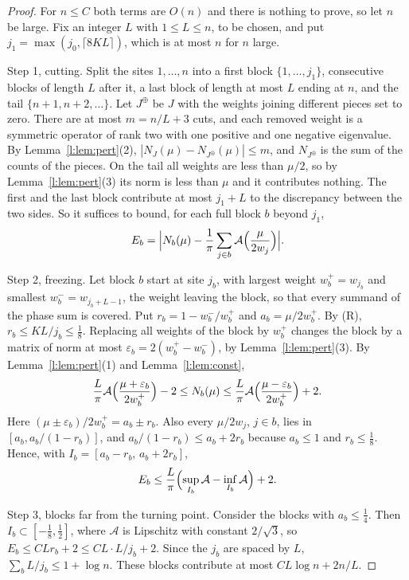 \begin{proof}
For $n\le C$ both terms are $O(n)$ and there is nothing to prove, so let $n$ be large. Fix an integer $L$ with $1\le L\le n$, to be chosen, and put $j_1=\max(j_0,\lceil8KL\rceil)$, which is at most $n$ for $n$ large.

Step 1, cutting. Split the sites $1,\dots,n$ into a first block $\{1,\dots,j_1\}$, consecutive blocks of length $L$ after it, a last block of length at most $L$ ending at $n$, and the tail $\{n+1,n+2,\dots\}$. Let $J^\oplus$ be $J$ with the weights joining different pieces set to zero. There are at most $m=n/L+3$ cuts, and each removed weight is a symmetric operator of rank two with one positive and one negative eigenvalue. By Lemma~\ref{l:lem:pert}(2), $|N_J(\mu)-N_{J^\oplus}(\mu)|\le m$, and $N_{J^\oplus}$ is the sum of the counts of the pieces. On the tail all weights are less than $\mu/2$, so by Lemma~\ref{l:lem:pert}(3) its norm is less than $\mu$ and it contributes nothing. The first and the last block contribute at most $j_1+L$ to the discrepancy between the two sides. So it suffices to bound, for each full block $b$ beyond $j_1$,
\[
E_b=\Bigl|N_b(\mu)-\frac1\pi\sum_{j\in b}\mathcal A\Bigl(\frac{\mu}{2w_j}\Bigr)\Bigr| .
\]

Step 2, freezing. Let block $b$ start at site $j_b$, with largest weight $w_b^+=w_{j_b}$ and smallest $w_b^-=w_{j_b+L-1}$, the weight leaving the block, so that every summand of the phase sum is covered. Put $r_b=1-w_b^-/w_b^+$ and $a_b=\mu/2w_b^+$. By (R), $r_b\le KL/j_b\le\frac18$. Replacing all weights of the block by $w_b^+$ changes the block by a matrix of norm at most $\varepsilon_b=2(w_b^+-w_b^-)$, by Lemma~\ref{l:lem:pert}(3). By Lemma~\ref{l:lem:pert}(1) and Lemma~\ref{l:lem:const},
\[
\frac L\pi\mathcal A\Bigl(\frac{\mu+\varepsilon_b}{2w_b^+}\Bigr)-2\le N_b(\mu)\le\frac L\pi\mathcal A\Bigl(\frac{\mu-\varepsilon_b}{2w_b^+}\Bigr)+2 .
\]
Here $(\mu\pm\varepsilon_b)/2w_b^+=a_b\pm r_b$. Also every $\mu/2w_j$, $j\in b$, lies in $[a_b,a_b/(1-r_b)]$, and $a_b/(1-r_b)\le a_b+2r_b$ because $a_b\le1$ and $r_b\le\frac18$. Hence, with $I_b=[a_b-r_b,\,a_b+2r_b]$,
\begin{equation}\label{l:eq:Eb}
E_b\le\frac L\pi\Bigl(\sup_{I_b}\mathcal A-\inf_{I_b}\mathcal A\Bigr)+2 .
\end{equation}

Step 3, blocks far from the turning point. Consider the blocks with $a_b\le\frac14$. Then $I_b\subset[-\frac18,\frac12]$, where $\mathcal A$ is Lipschitz with constant $2/\sqrt3$, so $E_b\le CLr_b+2\le CL\cdot L/j_b+2$. Since the $j_b$ are spaced by $L$, $\sum_bL/j_b\le1+\log n$. These blocks contribute at most $CL\log n+2n/L$.


\end{proof}
